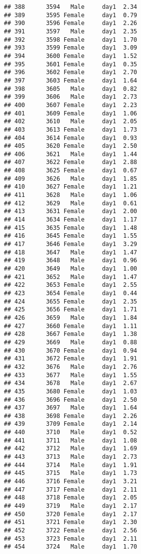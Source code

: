 \documentclass[
]{article}
\begin{document}
\begin{verbatim}
## 388      3594   Male     day1  2.34
## 389      3595 Female     day1  0.79
## 390      3596 Female     day1  2.26
## 391      3597   Male     day1  2.35
## 392      3598 Female     day1  1.70
## 393      3599 Female     day1  3.09
## 394      3600 Female     day1  1.52
## 395      3601 Female     day1  0.35
## 396      3602 Female     day1  2.70
## 397      3603 Female     day1  1.64
## 398      3605   Male     day1  0.82
## 399      3606   Male     day1  2.73
## 400      3607 Female     day1  2.23
## 401      3609 Female     day1  1.06
## 402      3610   Male     day1  2.05
## 403      3613 Female     day1  1.73
## 404      3614 Female     day1  0.93
## 405      3620 Female     day1  2.50
## 406      3621   Male     day1  1.44
## 407      3622 Female     day1  2.88
## 408      3625 Female     day1  0.67
## 409      3626   Male     day1  1.85
## 410      3627 Female     day1  1.21
## 411      3628   Male     day1  1.06
## 412      3629   Male     day1  0.61
## 413      3631 Female     day1  2.00
## 414      3634 Female     day1  1.17
## 415      3635 Female     day1  1.48
## 416      3645 Female     day1  1.55
## 417      3646 Female     day1  3.29
## 418      3647   Male     day1  1.47
## 419      3648   Male     day1  0.96
## 420      3649   Male     day1  1.00
## 421      3652   Male     day1  1.47
## 422      3653 Female     day1  2.55
## 423      3654 Female     day1  0.44
## 424      3655 Female     day1  2.35
## 425      3656 Female     day1  1.71
## 426      3659   Male     day1  1.84
## 427      3660 Female     day1  1.11
## 428      3667 Female     day1  1.38
## 429      3669   Male     day1  0.88
## 430      3670 Female     day1  0.94
## 431      3672 Female     day1  1.91
## 432      3676   Male     day1  2.76
## 433      3677   Male     day1  1.55
## 434      3678   Male     day1  2.67
## 435      3680 Female     day1  1.03
## 436      3696 Female     day1  2.50
## 437      3697   Male     day1  1.64
## 438      3698 Female     day1  2.26
## 439      3709 Female     day1  2.14
## 440      3710   Male     day1  0.52
## 441      3711   Male     day1  1.08
## 442      3712   Male     day1  1.69
## 443      3713   Male     day1  2.73
## 444      3714   Male     day1  1.91
## 445      3715   Male     day1  1.73
## 446      3716 Female     day1  3.21
## 447      3717 Female     day1  2.11
## 448      3718 Female     day1  2.05
## 449      3719   Male     day1  2.17
## 450      3720 Female     day1  2.17
## 451      3721 Female     day1  2.30
## 452      3722 Female     day1  2.56
## 453      3723 Female     day1  2.11
## 454      3724   Male     day1  1.70

\end{verbatim}
\end{document}

